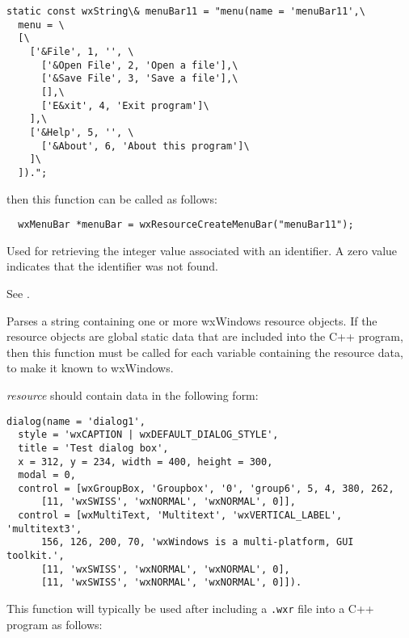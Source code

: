 \begin{verbatim}
static const wxString\& menuBar11 = "menu(name = 'menuBar11',\
  menu = \
  [\
    ['&File', 1, '', \
      ['&Open File', 2, 'Open a file'],\
      ['&Save File', 3, 'Save a file'],\
      [],\
      ['E&xit', 4, 'Exit program']\
    ],\
    ['&Help', 5, '', \
      ['&About', 6, 'About this program']\
    ]\
  ]).";
\end{verbatim}

then this function can be called as follows:

\begin{verbatim}
  wxMenuBar *menuBar = wxResourceCreateMenuBar("menuBar11");
\end{verbatim}


\membersection{::wxResourceGetIdentifier}


Used for retrieving the integer value associated with an identifier.
A zero value indicates that the identifier was not found.

See .

\label{wxresourcedata}


Parses a string containing one or more wxWindows resource objects. If
the resource objects are global static data that are included into the
C++ program, then this function must be called for each variable
containing the resource data, to make it known to wxWindows.

{\it resource} should contain data in the following form:

\begin{verbatim}
dialog(name = 'dialog1',
  style = 'wxCAPTION | wxDEFAULT_DIALOG_STYLE',
  title = 'Test dialog box',
  x = 312, y = 234, width = 400, height = 300,
  modal = 0,
  control = [wxGroupBox, 'Groupbox', '0', 'group6', 5, 4, 380, 262,
      [11, 'wxSWISS', 'wxNORMAL', 'wxNORMAL', 0]],
  control = [wxMultiText, 'Multitext', 'wxVERTICAL_LABEL', 'multitext3',
      156, 126, 200, 70, 'wxWindows is a multi-platform, GUI toolkit.',
      [11, 'wxSWISS', 'wxNORMAL', 'wxNORMAL', 0],
      [11, 'wxSWISS', 'wxNORMAL', 'wxNORMAL', 0]]).
\end{verbatim}

This function will typically be used after including a {\tt .wxr} file into
a C++ program as follows:

